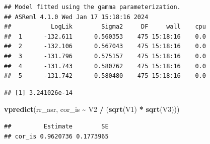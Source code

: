 \documentclass[
  12pt,
]{book}
\newenvironment{Shaded}{\begin{snugshade}}{\end{snugshade}}
\newcommand{\DataTypeTok}[1]{\textcolor[rgb]{0.13,0.29,0.53}{#1}}
\newcommand{\DecValTok}[1]{\textcolor[rgb]{0.00,0.00,0.81}{#1}}
\newcommand{\KeywordTok}[1]{\textcolor[rgb]{0.13,0.29,0.53}{\textbf{#1}}}
\newcommand{\NormalTok}[1]{#1}
\newcommand{\OperatorTok}[1]{\textcolor[rgb]{0.81,0.36,0.00}{\textbf{#1}}}
\newcommand{\OtherTok}[1]{\textcolor[rgb]{0.56,0.35,0.01}{#1}}
\newcommand{\StringTok}[1]{\textcolor[rgb]{0.31,0.60,0.02}{#1}}
\begin{document}
\begin{verbatim}
## Model fitted using the gamma parameterization.
## ASReml 4.1.0 Wed Jan 17 15:18:16 2024
##           LogLik        Sigma2     DF     wall    cpu
##  1      -132.611      0.560353    475 15:18:16    0.0
##  2      -132.106      0.567043    475 15:18:16    0.0
##  3      -131.796      0.575157    475 15:18:16    0.0
##  4      -131.743      0.580762    475 15:18:16    0.0
##  5      -131.742      0.580480    475 15:18:16    0.0
\end{verbatim}

\begin{Shaded}
\end{Shaded}

\begin{verbatim}
## [1] 3.241026e-14
\end{verbatim}

\begin{Shaded}
\begin{Highlighting}[]
\KeywordTok{vpredict}\NormalTok{(rr\_asr, cor\_is }\OperatorTok{\textasciitilde{}}\StringTok{ }\NormalTok{V2 }\OperatorTok{/}\StringTok{ }\NormalTok{(}\KeywordTok{sqrt}\NormalTok{(V1) }\OperatorTok{*}\StringTok{ }\KeywordTok{sqrt}\NormalTok{(V3)))}
\end{Highlighting}
\end{Shaded}

\begin{verbatim}
##         Estimate        SE
## cor_is 0.9620736 0.1773965
\end{verbatim}

\begin{Shaded}
\end{Shaded}
\end{document}
